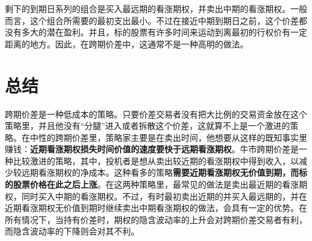剩下的到期日系列的组合是买入最远期的看涨期权，并卖出中期的看涨期权。一般而言，这个组合所需要的最初支出最小。不过在接近中期到期日之前，这个价差都没有多大的潜在盈利。并且，标的股票有许多时间来运动到离最初的行权价有一定距离的地方。因此，在跨期价差中，这通常不是一种高明的做法。
\section{总结}
跨期价差是一种低成本的策略。只要价差交易者没有把大比例的交易资金放在这个策略里，并且他没有“分腿”进入或者拆散这个价差，这就算不上是一个激进的策略。在中性的跨期价差里，策略家主要是在卖出时间，他想要从这样的既知事实里赚钱：\textbf{近期看涨期权损失时间价值的速度要快于远期看涨期权}。牛市跨期价差是一种比较激进的策略，其中，投机者是想从卖出较近期的看涨期权中得到收入，以减少较远期看涨期权的净成本。这种看多的策略\textbf{需要近期看涨期权无价值到期，而标的股票价格在此之后上涨}。在这两种策略里，最常见的做法是卖出最近期的看涨期权，同时买入中期的看涨期权。不过，有时最初卖出近期的并买入最远期的，并在近期看涨期权无价值到期时继续卖出中期看涨期权的做法，会具有一定的优势。在所有情况下，当持有价差时，期权的隐含波动率的上升会对跨期价差交易者有利，而隐含波动率的下降则会对其不利。